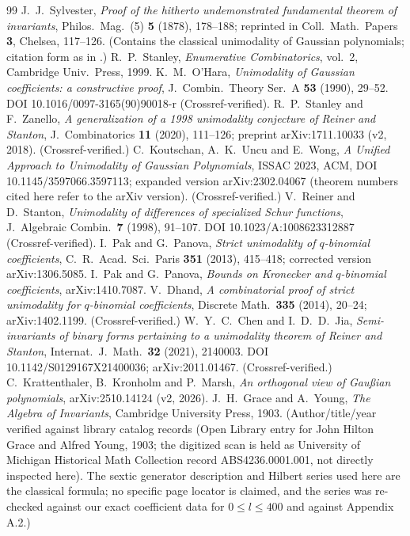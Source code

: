\documentclass[11pt,reqno]{article}
\theoremstyle{definition}
\begin{document}
\begin{thebibliography}{99}
 J.\ J.\ Sylvester, \emph{Proof of the hitherto undemonstrated fundamental theorem of invariants}, Philos.\ Mag.\ (5) \textbf{5} (1878), 178--188; reprinted in Coll.\ Math.\ Papers \textbf{3}, Chelsea, 117--126. (Contains the classical unimodality of Gaussian polynomials; citation form as in \cite{SZ,KUW}.)
 R.\ P.\ Stanley, \emph{Enumerative Combinatorics}, vol.\ 2, Cambridge Univ.\ Press, 1999.
 K.\ M.\ O'Hara, \emph{Unimodality of Gaussian coefficients: a constructive proof}, J.\ Combin.\ Theory Ser.\ A \textbf{53} (1990), 29--52. DOI 10.1016/0097-3165(90)90018-r (Crossref-verified).
 R.\ P.\ Stanley and F.\ Zanello, \emph{A generalization of a 1998 unimodality conjecture of Reiner and Stanton}, J.\ Combinatorics \textbf{11} (2020), 111--126; preprint arXiv:1711.10033 (v2, 2018). (Crossref-verified.)
 C.\ Koutschan, A.\ K.\ Uncu and E.\ Wong, \emph{A Unified Approach to Unimodality of Gaussian Polynomials}, ISSAC 2023, ACM, DOI 10.1145/3597066.3597113; expanded version arXiv:2302.04067 (theorem numbers cited here refer to the arXiv version). (Crossref-verified.)
 V.\ Reiner and D.\ Stanton, \emph{Unimodality of differences of specialized Schur functions}, J.\ Algebraic Combin.\ \textbf{7} (1998), 91--107. DOI 10.1023/A:1008623312887 (Crossref-verified).
 I.\ Pak and G.\ Panova, \emph{Strict unimodality of $q$-binomial coefficients}, C.\ R.\ Acad.\ Sci.\ Paris \textbf{351} (2013), 415--418; corrected version arXiv:1306.5085.
 I.\ Pak and G.\ Panova, \emph{Bounds on Kronecker and $q$-binomial coefficients}, arXiv:1410.7087.
 V.\ Dhand, \emph{A combinatorial proof of strict unimodality for $q$-binomial coefficients}, Discrete Math.\ \textbf{335} (2014), 20--24; arXiv:1402.1199. (Crossref-verified.)
 W.\ Y.\ C.\ Chen and I.\ D.\ D.\ Jia, \emph{Semi-invariants of binary forms pertaining to a unimodality theorem of Reiner and Stanton}, Internat.\ J.\ Math.\ \textbf{32} (2021), 2140003. DOI 10.1142/S0129167X21400036; arXiv:2011.01467. (Crossref-verified.)
 C.\ Krattenthaler, B.\ Kronholm and P.\ Marsh, \emph{An orthogonal view of Gau\ss{}ian polynomials}, arXiv:2510.14124 (v2, 2026).
 J.\ H.\ Grace and A.\ Young, \emph{The Algebra of Invariants}, Cambridge University Press, 1903. (Author/title/year verified against library catalog records (Open Library entry for John Hilton Grace and Alfred Young, 1903; the digitized scan is held as University of Michigan Historical Math Collection record ABS4236.0001.001, not directly inspected here). The sextic generator description and Hilbert series used here are the classical formula; no specific page locator is claimed, and the series was re-checked against our exact coefficient data for $0\le l\le400$ and against \cite{KKM} Appendix A.2.)

\end{thebibliography}
\end{document}
